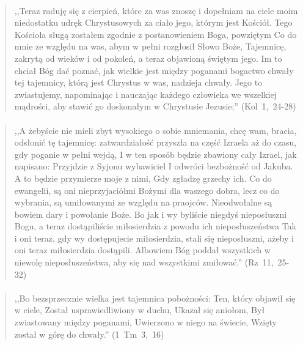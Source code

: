 \documentclass[10pt,a4paper,oneside]{article}
\begin{document}
\paragraph{}
\begin{quote}
,,Teraz raduję się z cierpień, które za was znoszę i dopełniam na ciele moim niedostatku udręk Chrystusowych za ciało jego, którym jest Kościół. Tego Kościoła sługą zostałem zgodnie z postanowieniem Boga, powziętym Co do mnie ze względu na was, abym w pełni rozgłosił Słowo Boże, Tajemnicę, zakrytą od wieków i od pokoleń, a teraz objawioną świętym jego. Im to chciał Bóg dać poznać, jak wielkie jest między poganami bogactwo chwały tej tajemnicy, którą jest Chrystus w was, nadzieja chwały. Jego to zwiastujemy, napominając i nauczając każdego człowieka we wszelkiej mądrości, aby stawić go doskonałym w Chrystusie Jezusie;'' \mbox{(Kol 1, 24-28)}
\end{quote}
\paragraph{}
\begin{quote}
,,A żebyście nie mieli zbyt wysokiego o sobie mniemania, chcę wam, bracia, odsłonić tę tajemnicę: zatwardziałość przyszła na część Izraela aż do czasu, gdy poganie w pełni wejdą, I w ten sposób będzie zbawiony cały Izrael, jak napisano: Przyjdzie z Syjonu wybawiciel I odwróci bezbożność od Jakuba. A to będzie przymierze moje z nimi, Gdy zgładzę grzechy ich. Co do ewangelii, są oni nieprzyjaciółmi Bożymi dla waszego dobra, lecz co do wybrania, są umiłowanymi ze względu na praojców. Nieodwołalne są bowiem dary i powołanie Boże. Bo jak i wy byliście niegdyś nieposłuszni Bogu, a teraz dostąpiliście miłosierdzia z powodu ich nieposłuszeństwa Tak i oni teraz, gdy wy dostępujecie miłosierdzia, stali się nieposłuszni, ażeby i oni teraz miłosierdzia dostąpili. Albowiem Bóg poddał wszystkich w niewolę nieposłuszeństwa, aby się nad wszystkimi zmiłować.'' \mbox{(Rz 11, 25-32)}
\end{quote}
\paragraph{}
\begin{quote}
,,Bo bezsprzecznie wielka jest tajemnica pobożności: Ten, który objawił się w ciele, Został usprawiedliwiony w duchu, Ukazał się aniołom, Był zwiastowany między poganami, Uwierzono w niego na świecie, Wzięty został w górę do chwały.'' \mbox{(1 Tm 3, 16)}
\end{quote}
\end{document}
